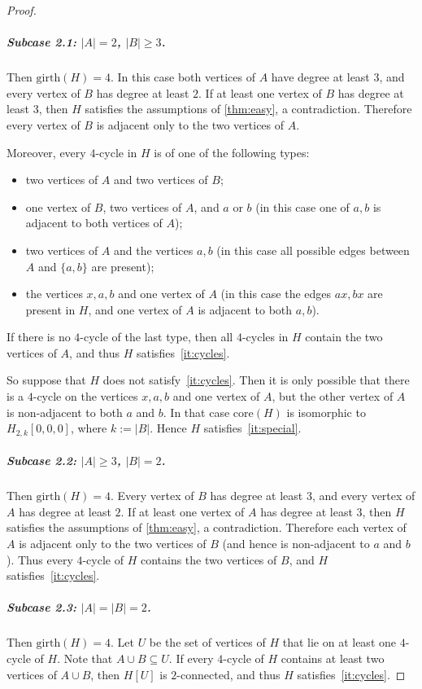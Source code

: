 \documentclass[a4paper,UKenglish,cleveref, autoref, thm-restate]{lipics-v2021}
\newcommand{\girth}{\mathrm{girth}}
\newcommand{\core}{\mathrm{core}}
\begin{document}
\begin{proof}
\subparagraph*{Subcase 2.1: \boldmath $|A|=2$, $|B|\geq 3$.}
Then $\girth(H)=4$.
In this case both vertices of $A$ have degree at least $3$, and every vertex of $B$ has degree at least $2$.
If at least one vertex of $B$ has degree at least $3$, then $H$ satisfies the assumptions of \cref{thm:easy}, a contradiction.
Therefore every vertex of $B$ is adjacent only to the two vertices of $A$.

Moreover, every $4$-cycle in $H$ is of one of the following types:
\begin{itemize}
    \item two vertices of $A$ and two vertices of $B$;
    \item one vertex of $B$, two vertices of $A$, and $a$ or $b$ (in this case one of $a,b$ is adjacent to both vertices of $A$);
    \item two vertices of $A$ and the vertices $a,b$ (in this case all possible edges between $A$ and $\{a,b\}$ are present);
    \item the vertices $x,a,b$ and one vertex of $A$ (in this case the edges $ax,bx$ are present in $H$, and one vertex of $A$ is adjacent to both $a,b$).
\end{itemize}
If there is no $4$-cycle of the last type, then all $4$-cycles in $H$ contain the two vertices of $A$, and thus $H$ satisfies~\ref{it:cycles}.

So suppose that $H$ does not satisfy~\ref{it:cycles}.
Then it is only possible that there is a $4$-cycle on the vertices $x,a,b$ and one vertex of $A$, but the other vertex of $A$ is non-adjacent to both $a$ and $b$.
In that case $\core(H)$ is isomorphic to $H_{2,k}[0,0,0]$, where $k:=|B|$.
Hence $H$ satisfies~\ref{it:special}.

\subparagraph*{Subcase 2.2: \boldmath $|A|\geq 3$, $|B|=2$.}
Then $\girth(H)=4$.
Every vertex of $B$ has degree at least $3$, and every vertex of $A$ has degree at least $2$.
If at least one vertex of $A$ has degree at least $3$, then $H$ satisfies the assumptions of \cref{thm:easy}, a contradiction.
Therefore each vertex of $A$ is adjacent only to the two vertices of $B$ (and hence is non-adjacent to $a$ and $b$).
Thus every $4$-cycle of $H$ contains the two vertices of $B$, and $H$ satisfies~\ref{it:cycles}.

\subparagraph*{Subcase 2.3: \boldmath $|A|=|B|=2$.}
Then $\girth(H)=4$.
Let $U$ be the set of vertices of $H$ that lie on at least one $4$-cycle of $H$.
Note that $A\cup B\subseteq U$.
If every $4$-cycle of $H$ contains at least two vertices of $A\cup B$, then $H[U]$ is $2$-connected, and thus $H$ satisfies~\ref{it:cycles}.


\end{proof}
\end{document}
